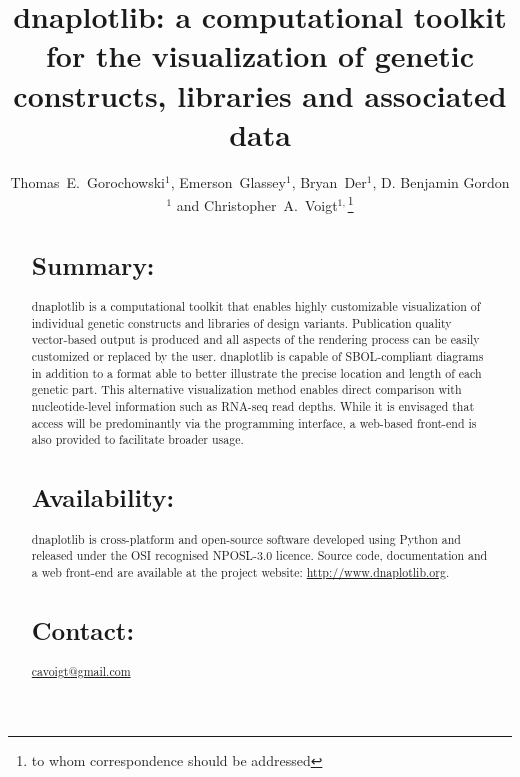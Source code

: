 \documentclass{bioinfo}
\begin{document}

\title[dnaplotlib]{dnaplotlib: a computational toolkit for the visualization of genetic constructs, libraries and associated data}
\author[Thomas E. Gorochowski \textit{et~al.}]{Thomas~E.~Gorochowski$^{1}$, Emerson~Glassey$^{1}$, Bryan~Der$^{1}$, D. Benjamin Gordon$^{1}$ and Christopher~A.~Voigt$^{1,}$\footnote{to whom correspondence should be addressed}}
\address{$^{1}$Department of Biological Engineering, Synthetic Biology Center, Massachusetts Institute of Technology, USA.}



\maketitle

\begin{abstract}

\section{Summary:}
dnaplotlib is a computational toolkit that enables highly customizable visualization of individual genetic constructs and libraries of design variants. Publication quality vector-based output is produced and all aspects of the rendering process can be easily customized or replaced by the user. dnaplotlib is capable of SBOL-compliant diagrams in addition to a format able to better illustrate the precise location and length of each genetic part. This alternative visualization method enables direct comparison with nucleotide-level information such as RNA-seq read depths. While it is envisaged that access will be predominantly via the programming interface, a web-based front-end is also provided to facilitate broader usage.

\section{Availability:}
dnaplotlib is cross-platform and open-source software developed using Python and released under the OSI recognised NPOSL-3.0 licence. Source code, documentation and a web front-end are available at the project website: \href{http://www.dnaplotlib.org}{http://www.dnaplotlib.org}.

\section{Contact:} \href{cavoigt@gmail.com}{cavoigt@gmail.com}
\end{abstract}
\end{document}
